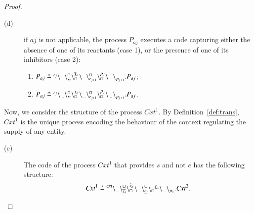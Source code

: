 \begin{proof}
\begin{description}
\item[(d)] 
 if $aj$ is not applicable,
the process $P_{aj}$ executes a code  capturing either the absence of one of its reactants (case 1), or the presence  of one of its inhibitors (case 2):
\begin{enumerate}
\item $P_{aj}\triangleq {}^{r_j} \backslash_{\dots}^{}\backslash_{\overline{s}_i}^{\scriptstyle {\square}}\backslash_{\scriptstyle {\square}}^{\overline{s}_o}{}^{} \backslash_{\dots}^{} \backslash_{r_{j+1}}^{\scriptstyle {\square}}\backslash_{\scriptstyle {\square}}^{p_j}{}^{} \backslash_{\dots}^{}{}^{} \backslash_{p_{j+1}}^{}.P_{aj} $;
\item $P_{aj}\triangleq {}^{r_j} \backslash_{\dots}^{}\backslash_{s_i}^{\scriptstyle {\square}}\backslash_{\scriptstyle {\square}}^{s_o}{}^{} \backslash_{\dots}^{} \backslash_{r_{j+1}}^{\scriptstyle {\square}}\backslash_{\scriptstyle {\square}}^{p_j}{}^{} \backslash_{\dots}^{}{}^{} \backslash_{p_{j+1}}^{} .P_{aj}$.
\end{enumerate}
\end{description}
Now, we consider the structure of the process $\mathit{Cxt}^1$. 
By Definition~\ref{def:trans}, $Cxt^1$ is the unique process encoding the behaviour of the context regulating the supply of any entity. 

\begin{description}
\item[(e)] 
The code of the process $Cxt^1$ that provides $s$ and not $e$ has the following structure: 
$$
\mathit{Cxt}^1 \triangleq
{}^{\mathit{cxt}} \backslash_{\dots}^{}
\backslash_{\widehat{s}_i}^{\scriptstyle {\square}}\backslash_{\scriptstyle {\square}}^{\widehat{s}_o}{}^{} \backslash_{\dots}^{} 
\backslash_{\underline{e}_i}^{\scriptstyle {\square}}\backslash_{\scriptstyle {\square}}^{}{}^{\underline{e}_o} \backslash_{\dots}^{} 
\backslash_{p_{1}}^{}. \mathit{Cxt}^{2} .
$$
\end{description}



\end{proof}
